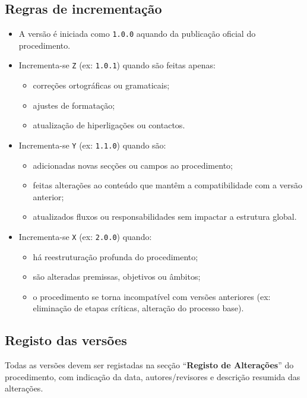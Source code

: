 \subsection*{Regras de incrementação}

\begin{itemize}
  \item A versão é iniciada como \texttt{1.0.0} aquando da publicação oficial do procedimento.
  \item Incrementa-se \texttt{Z} (ex: \texttt{1.0.1}) quando são feitas apenas:
  \begin{itemize}
    \item correções ortográficas ou gramaticais;
    \item ajustes de formatação;
    \item atualização de hiperligações ou contactos.
  \end{itemize}
  \item Incrementa-se \texttt{Y} (ex: \texttt{1.1.0}) quando são:
  \begin{itemize}
    \item adicionadas novas secções ou campos ao procedimento;
    \item feitas alterações ao conteúdo que mantêm a compatibilidade com a versão anterior;
    \item atualizados fluxos ou responsabilidades sem impactar a estrutura global.
  \end{itemize}
  \item Incrementa-se \texttt{X} (ex: \texttt{2.0.0}) quando:
  \begin{itemize}
    \item há reestruturação profunda do procedimento;
    \item são alteradas premissas, objetivos ou âmbitos;
    \item o procedimento se torna incompatível com versões anteriores (ex: eliminação de etapas críticas, alteração do processo base).
  \end{itemize}
\end{itemize}

\subsection*{Registo das versões}

Todas as versões devem ser registadas na secção “\textbf{Registo de Alterações}” do procedimento, com indicação da data, autores/revisores e descrição resumida das alterações.



